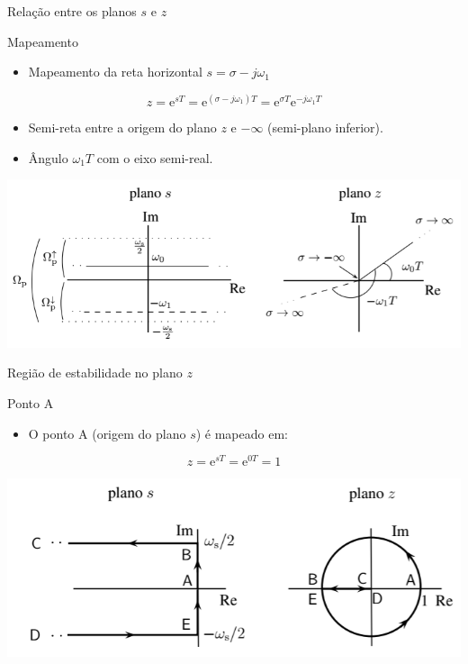 \begin{frame}{Relação entre os planos $s$ e $z$}
\begin{block}{Mapeamento}
\begin{itemize}
	\item Mapeamento da reta horizontal $s = \sigma - j\omega_1$
\end{itemize}
$$z = \text{e}^{sT} = \text{e}^{(\sigma - j\omega_1)T} = \text{e}^{\sigma T} \text{e}^{-j\omega_1 T}$$
\begin{itemize}
	\item Semi-reta entre a origem do plano $z$ e $-\infty$ (semi-plano inferior).
	\item Ângulo $\omega_1 T$ com o eixo semi-real. 
\end{itemize}
\end{block}
\centerline{\includegraphics[width=0.9\linewidth]{Figuras/Ch05/fig2.PNG}}
\end{frame}

\begin{frame}{Região de estabilidade no plano $z$}
\begin{block}{Ponto A}
\begin{itemize}
	\item O ponto A (origem do plano $s$) é mapeado em:
\end{itemize}
$$z = \text{e}^{sT} = \text{e}^{0T} = 1$$
\end{block}
\centerline{\includegraphics[width=0.9\linewidth]{Figuras/Ch05/fig3.PNG}}
\end{frame}

